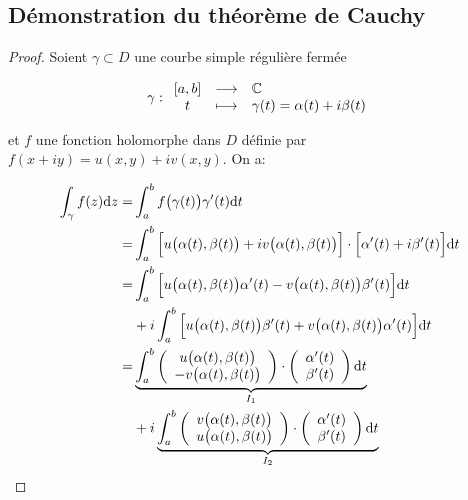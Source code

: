 \newpage

\subsection{Démonstration du théorème de Cauchy}

\begin{proof}
    Soient $\gamma \subset D$ une courbe simple régulière fermée
    
    \[\gamma: \begin{array}{ccl} [a,b] & \longrightarrow & \mathbb{C}\\ t & \longmapsto & \gamma(t) = \alpha(t) + i\beta(t)\end{array}\]
    
    et $f$ une fonction holomorphe dans $D$ définie par $f(x + iy) = u(x,y) + iv(x,y)$.
    On a:
    
    \begin{align*}
    \int_\gamma f(z) \mathrm{d}z
    =& \int_a^b f\big(\gamma(t)\big) \gamma'(t) \mathrm{d}t
    \\=& \int_a^b \Big[u\big(\alpha(t), \beta(t)\big) + i v\big(\alpha(t), \beta(t)\big)\Big] \cdot \Big[\alpha'(t) + i\beta'(t)\Big] \mathrm{d}t
    \\=& \int_a^b \Big[u\big(\alpha(t), \beta(t)\big) \alpha'(t) - v\big(\alpha(t), \beta(t)\big) \beta'(t)\Big] \mathrm{d}t
      \\&+ i \int_a^b \Big[u\big(\alpha(t), \beta(t)\big) \beta'(t) + v\big(\alpha(t), \beta(t)\big) \alpha'(t)\Big] \mathrm{d}t
    \\=& \underbrace{\int_a^b \left(
    \begin{array}{c}
    u\big(\alpha(t), \beta(t)\big)\\
    - v\big(\alpha(t), \beta(t)\big)
    \end{array} \right) \cdot \left(
    \begin{array}{c}
    \alpha'(t)\\
    \beta'(t)
    \end{array} \right) \mathrm{d}t}_{I_1}
      \\&+ i \underbrace{\int_a^b \left(
      \begin{array}{c}
      v\big(\alpha(t), \beta(t)\big)\\
      u\big(\alpha(t), \beta(t)\big)
      \end{array} \right) \cdot \left(
      \begin{array}{c}
      \alpha'(t)\\
      \beta'(t)
      \end{array} \right) \mathrm{d}t}_{I_2}
    \end{align*}
    

\end{proof}
